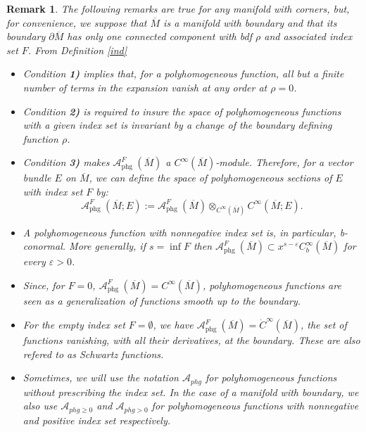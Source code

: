 \documentclass[a4paper,11pt]{article}
\newcounter{mythm}[section]
\newtheorem{rem}[mythm]{Remark}
\begin{document}
\begin{rem} The following remarks are true for any manifold with corners, but, for convenience, we suppose that $\overline{M}$ is a manifold with boundary and that its boundary $\partial \overline{M}$ has only one connected component with bdf $\rho$ and associated index set $F$. From Definition \ref{ind}
\begin{itemize}
\item Condition \textbf{1)} implies that, for a polyhomogeneous function, all but a finite number of terms in the expansion vanish at any order at $\rho=0$.
\item Condition \textbf{2)} is required to insure the space of polyhomogeneous functions with a given index set is invariant by a change of the boundary defining function $\rho$.
\item Condition \textbf{3)} makes $\mathcal{A}_{\text {phg }}^F(\overline{M})$ a $C^{\infty}(\overline{M})$-module. Therefore, for a vector bundle $E$ on $\overline{M}$, we can define the space of polyhomogeneous sections of $E$ with index set $F$ by: 
$$\mathcal{A}_{\text {phg }}^F(\overline{M} ; E) := \mathcal{A}_{\text {phg }}^F(\overline{M}) \otimes_{C^{\infty}(\overline{M})} C^{\infty}(\overline M ; E). $$
\item A polyhomogeneous function with nonnegative index set is, in particular, b-conormal. More generally, if $s = \inf F$ then $\mathcal{A}_{\text {phg }}^F(\overline{M}) \subset x^{s - \varepsilon} C_{b}^{\infty}(\overline M)$ for every $\varepsilon>0$. 
\item Since, for $F=0$, $\mathcal{A}_{\text {phg }}^F(\overline{M})=C^{\infty}(\overline M) $, polyhomogeneous functions are seen as a generalization of functions smooth up to the boundary. 
\item For the empty index set $F= \emptyset$, we have
 $\mathcal{A}_{\text {phg }}^F(\overline{M})=\dot{C}^{\infty}(\overline M) $, the set of functions vanishing, with all their derivatives, at the boundary. These are also refered to as Schwartz functions.
 \item Sometimes, we will use the notation $\mathcal{A}_{phg}$ for polyhomogeneous functions without prescribing the index set. In the case of a manifold with boundary, we also use $\mathcal{A}_{phg \geq0}$ and $\mathcal{A}_{phg > 0}$ for polyhomogeneous functions with nonnegative and positive index set respectively.
\end{itemize}
\end{rem}
\end{document}
